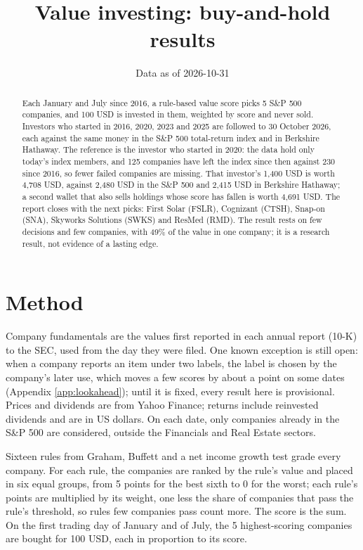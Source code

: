 \documentclass[11pt,a4paper]{article}
\title{Value investing: buy-and-hold results}
\author{Data as of 2026-10-31}
\date{}
\begin{document}
\maketitle
\begin{abstract}
Each January and July since 2016, a rule-based value score picks 5 S\&P 500 companies, and 100 USD is invested in them, weighted by score and never sold. Investors who started in 2016, 2020, 2023 and 2025 are followed to 30 October 2026, each against the same money in the S\&P 500 total-return index and in Berkshire Hathaway. The reference is the investor who started in 2020: the data hold only today's index members, and 125 companies have left the index since then against 230 since 2016, so fewer failed companies are missing. That investor's 1,400 USD is worth 4,708 USD, against 2,480 USD in the S\&P 500 and 2,415 USD in Berkshire Hathaway; a second wallet that also sells holdings whose score has fallen is worth 4,691 USD. The report closes with the next picks: First Solar (FSLR), Cognizant (CTSH), Snap-on (SNA), Skyworks Solutions (SWKS) and ResMed (RMD). The result rests on few decisions and few companies, with 49\% of the value in one company; it is a research result, not evidence of a lasting edge.
\end{abstract}
\section{Method}
Company fundamentals are the values first reported in each annual report (10-K) to the SEC, used from the day they were filed. One known exception is still open: when a company reports an item under two labels, the label is chosen by the company's later use, which moves a few scores by about a point on some dates (Appendix \ref{app:lookahead}); until it is fixed, every result here is provisional. Prices and dividends are from Yahoo Finance; returns include reinvested dividends and are in US dollars. On each date, only companies already in the S\&P 500 are considered, outside the Financials and Real Estate sectors.

Sixteen rules from Graham, Buffett and a net income growth test grade every company. For each rule, the companies are ranked by the rule's value and placed in six equal groups, from 5 points for the best sixth to 0 for the worst; each rule's points are multiplied by its weight, one less the share of companies that pass the rule's threshold, so rules few companies pass count more. The score is the sum. On the first trading day of January and of July, the 5 highest-scoring companies are bought for 100 USD, each in proportion to its score.
\end{document}

